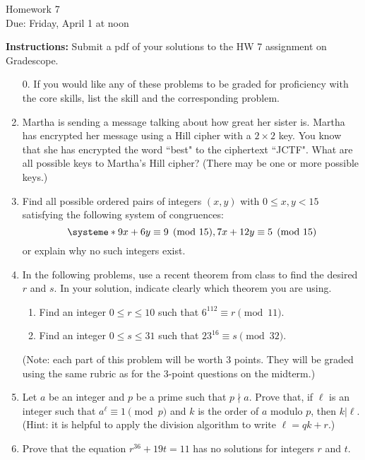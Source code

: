 \documentclass[12pt]{article}
\begin{document}
\begin{center}
{\Large Homework 7}\\
Due: Friday,  April 1 at noon\\


\end{center}
{\bf Instructions:} Submit a pdf of your solutions to the HW 7 assignment on Gradescope. 



\begin{enumerate}
\item[0.] If you would like any of these problems to be graded for proficiency with the core skills, list the skill and the corresponding problem. 
\item Martha is sending a message talking about how great her sister is.  Martha has encrypted her message using a Hill cipher with a $2\times 2$ key.  You know that she has encrypted the word ``best" to the ciphertext ``JCTF".  What are all possible keys to Martha's Hill cipher? (There may be one or more possible keys.)

\item Find all possible ordered pairs of integers $(x,y)$ with $0\le x,y<15$ satisfying the following system of congruences:
$$\systeme*{9x+6y\equiv 9\pmod{15}, 7x+12y\equiv 5\pmod{15}}$$ or explain why no such integers exist. 


\item In the following problems,  use a recent theorem from class to find the desired $r$ and $s$.  In your solution, indicate clearly which theorem you are using. 
\begin{enumerate}
\item Find an integer $0\le r\le 10$ such that $6^{112}\equiv r\pmod{11}$.
\item Find an integer $0\le s\le 31$ such that $23^{16}\equiv s\pmod{32}$. 
\end{enumerate}
(Note: each part of this problem will be worth 3 points. They will be graded using the same rubric as for the 3-point questions on the midterm.)

\item Let $a$ be an integer and $p$ be a prime such that $p\nmid a$.  Prove that, if $\ell$ is an integer such that $a^{\ell}\equiv 1\pmod{p}$ and $k$ is the order of $a$ modulo $p$, then $k|\ell$.  (Hint: it is helpful to apply the division algorithm to write $\ell=qk+r$.)


\item Prove that the equation $r^{36}+19t=11$ has no solutions for integers $r$ and $t$. 
\end{enumerate}
\end{document}
